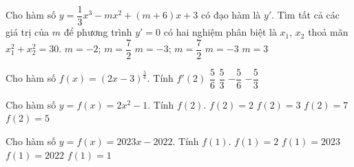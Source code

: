 \begin{ex}%
	Cho hàm số $y=\dfrac{1}{3}x^3-mx^2+(m+6)x+3$ có đạo hàm là $y'$.  Tìm tất cả các giá trị của $m$ để phương trình $y'=0$ có hai nghiệm phân biệt là $x_1$, $x_2$ thoả mãn $x_1^2+x_2^2=30$.
	 \choice
		{$m=-2$; $m=\dfrac{7}{2}$} 
		{\True  $m=-3$; $m=\dfrac{7}{2}$}
		 {$m=-3$}
		 {$m=3$}
\end{ex}

\begin{ex}%
	Cho hàm số $f(x)=\left( 2x-3 \right)^{\frac{5}{6}}$. Tính  $f'(2)$
	 \choice
		{$  \dfrac{5}{6} $}
		{\True  $ \dfrac{5}{3} $}
		{$  -\dfrac{5}{6} $}
		{$ -\dfrac{5}{3}  $}
\end{ex}

\begin{ex}%
	Cho hàm số $y=f(x)=2x^2-1$. Tính  $f(2)$.
	 \choice
		{$f(2)=2$} 
		 {$f(2)=3$}
		 {\True $f(2)=7$}
		 {$f(2)=5$}
\end{ex}

\begin{ex}%
	Cho hàm số  $y=f(x)=2023x-2022$. Tính $f(1)$.
	 \choice
		 {$f(1)=2$}
		 {$f(1)=2023$}
		{$f(1)=2022$} 
		 {\True $f(1)=1$}
\end{ex}

